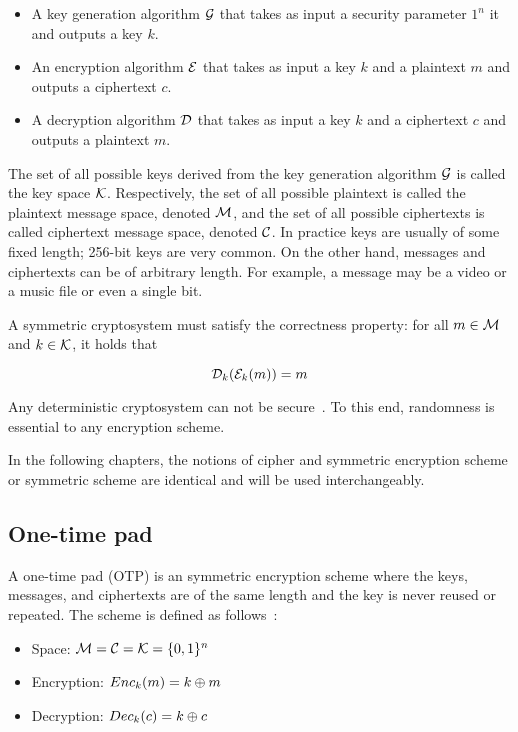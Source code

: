 \begin{itemize}
  \item A key generation algorithm $\mathcal{G}$ that takes as input a security parameter $1^{n}$ it and outputs a key $k$.
  \item An encryption algorithm $\mathcal{E}$ that takes as input a key $k$ and a plaintext $m$ and outputs a ciphertext $c$.
  \item A decryption algorithm $\mathcal{D}$ that takes as input a key $k$ and a ciphertext $c$ and outputs a plaintext $m$.
\end{itemize}

The set of all possible keys derived from the key generation algorithm $\mathcal{G}$ is called the key space $\mathcal{K}$. Respectively, the set of all possible plaintext is called the plaintext message space, denoted $\mathcal{M}$, and the set of all possible ciphertexts is called ciphertext message space, denoted $\mathcal{C}$. In practice keys are usually of some fixed length; 256-bit keys are very common. On the other hand, messages and ciphertexts can be of arbitrary length. For example, a message may be a video or a music file or even a single bit.

A symmetric cryptosystem must satisfy the correctness property: for all $m \in \mathcal{M}$ and $k \in \mathcal{K}$, it holds that

\begin{equation*}
  \mathcal{D}_{k}(\mathcal{E}_{k}(m)) = m
\end{equation*}

Any deterministic cryptosystem can not be secure~\cite{Katz:2014:IMC:2700550, kiagias:crypto}. To this end, randomness is essential to any encryption scheme.

In the following chapters, the notions of cipher and symmetric encryption scheme or symmetric scheme are identical and will be used interchangeably.

\subsection{One-time pad}
\label{preliminaries:sym:otp}

A one-time pad (OTP) is an symmetric encryption scheme where the keys, messages, and ciphertexts are of the same length and the key is never reused or repeated. The scheme is defined as follows~\cite{kiagias:crypto, boneh_crypto}:

\begin{itemize}
  \item Space: $\mathcal{M} = \mathcal{C} = \mathcal{K} = \{0, 1\}^{n}$
  \item Encryption: $Enc_k(m) = k \oplus m$
  \item Decryption: $Dec_k(c) = k \oplus c$
\end{itemize}

